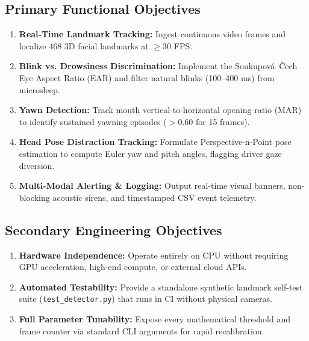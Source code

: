 \documentclass[11pt,a4paper]{article}
\begin{document}
\subsection{Primary Functional Objectives}
\begin{enumerate}
    \item \textbf{Real-Time Landmark Tracking:} Ingest continuous video frames and localize 468 3D facial landmarks at $\ge 30$ FPS.
    \item \textbf{Blink vs. Drowsiness Discrimination:} Implement the Soukupov\'a--\v{C}ech Eye Aspect Ratio (EAR) and filter natural blinks (100--400 ms) from microsleep.
    \item \textbf{Yawn Detection:} Track mouth vertical-to-horizontal opening ratio (MAR) to identify sustained yawning episodes ($> 0.60$ for 15 frames).
    \item \textbf{Head Pose Distraction Tracking:} Formulate Perspective-n-Point pose estimation to compute Euler yaw and pitch angles, flagging driver gaze diversion.
    \item \textbf{Multi-Modal Alerting \& Logging:} Output real-time visual banners, non-blocking acoustic sirens, and timestamped CSV event telemetry.
\end{enumerate}

\subsection{Secondary Engineering Objectives}
\begin{enumerate}
    \item \textbf{Hardware Independence:} Operate entirely on CPU without requiring GPU acceleration, high-end compute, or external cloud APIs.
    \item \textbf{Automated Testability:} Provide a standalone synthetic landmark self-test suite (\texttt{test\_detector.py}) that runs in CI without physical cameras.
    \item \textbf{Full Parameter Tunability:} Expose every mathematical threshold and frame counter via standard CLI arguments for rapid recalibration.
\end{enumerate}
\end{document}
